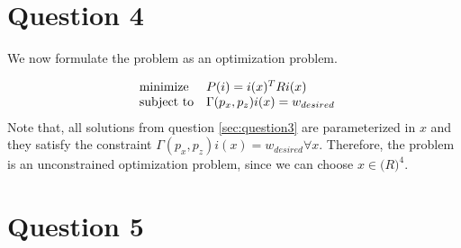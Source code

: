\documentclass[a4paper,10pt]{article}
\begin{document}
\section{Question 4} \label{sec:question4}
We now formulate the problem as an optimization problem.

\begin{equation}
\begin{array}{ll@{}ll}
\text{minimize}  & P(i)=i(x)^TRi(x)\\
\text{subject to}& \Gamma(p_x,p_z)i(x)=w_{desired}
\end{array}
\end{equation}
Note that, all solutions from question \ref{sec:question3} are parameterized in $x$ and they satisfy the constraint $\Gamma(p_x,p_z)i(x)=w_{desired} \forall x$. Therefore, the problem is an unconstrained optimization problem, since we can choose $x \in \mathbb(R)^4$. 

\section{Question 5}
\cite{minimax}



\end{document}
